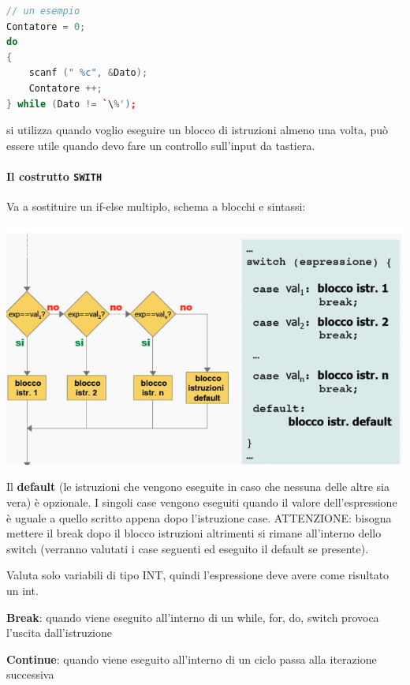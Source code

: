 \documentclass[
  paper=a4,
  oneside  ,captions=tableheading
]{scrbook}
\begin{document}
\begin{lstlisting}[language={C++}]
// un esempio
Contatore = 0;
do
{
    scanf (" %c", &Dato);
    Contatore ++;
} while (Dato != `\%');
\end{lstlisting}

si utilizza quando voglio eseguire un blocco di istruzioni almeno una
volta, può essere utile quando devo fare un controllo sull'input da
tastiera.

\hypertarget{il-costrutto-swith}{%
\paragraph{\texorpdfstring{Il costrutto
\texttt{SWITH}}{Il costrutto SWITH}}\label{il-costrutto-swith}}

Va a sostituire un if-else multiplo, schema a blocchi e sintassi:

\includegraphics{./image/image-20201207224317378.png}

Il \textbf{default} (le istruzioni che vengono eseguite in caso che
nessuna delle altre sia vera) è opzionale. I singoli case vengono
eseguiti quando il valore dell'espressione è uguale a quello scritto
appena dopo l'istruzione case. ATTENZIONE: bisogna mettere il break dopo
il blocco istruzioni altrimenti si rimane all'interno dello switch
(verranno valutati i case seguenti ed eseguito il default se presente).

Valuta solo variabili di tipo INT, quindi l'espressione deve avere come
risultato un int.

\textbf{Break}: quando viene eseguito all'interno di un while, for, do,
switch provoca l'uscita dall'istruzione

\textbf{Continue}: quando viene eseguito all'interno di un ciclo passa
alla iterazione successiva
\end{document}
